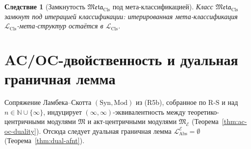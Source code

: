 \documentclass[11pt]{article}
\theoremstyle{plain}
\newtheorem{corollary}[theorem]{Следствие}
\theoremstyle{definition}
\newcommand{\RS}{\mathrm{R\text{-}S}}
\newcommand{\fM}{\mathfrak{M}}
\newcommand{\Meta}{\mathfrak{Meta}}
\newcommand{\LCls}{\mathcal{L}_{\mathrm{Cls}}}
\newcommand{\LAbs}{\mathcal{L}_{\mathrm{Abs}}}
\newcommand{\Syn}{\mathrm{Syn}}
\newcommand{\Mod}{\mathrm{Mod}}
\newcommand{\cE}{\mathcal{E}}
\newcommand{\LAbsE}{\LAbs^{\cE}}
\begin{document}
\begin{corollary}[Замкнутость $\Meta_{\mathrm{Cls}}$ под мета-классификацией]\label{cor:meta-closure}
Класс $\Meta_{\mathrm{Cls}}$ замкнут под итерацией классификации: итерированная мета-классификация $\LCls$-мета-структур остаётся в $\LCls$.
\end{corollary}

\section{AC/OC-двойственность и дуальная граничная лемма}\label{sec:ac-oc-duality}

Сопряжение Ламбека--Скотта $(\Syn, \Mod)$ из (R5b), собранное по $\RS$ и над $n \in \mathbb{N} \cup \{\infty\}$, индуцирует $(\infty, \infty)$-эквивалентность между теоретико-центричными модулями $\fM$ и акт-центричными модулями $\fM_\cE$ (Теорема~\ref{thm:ac-oc-duality}). Отсюда следует дуальная граничная лемма $\LAbsE = \emptyset$ (Теорема~\ref{thm:dual-afnt}).
\end{document}
